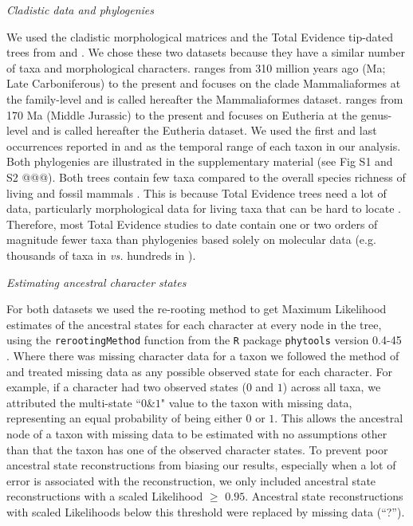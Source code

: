 \documentclass[12pt,letterpaper]{article}
\renewcommand{\subsection}[1]{%
\bigskip
\begin{center}
\begin{large}
\normalfont\itshape #1
\end{large}
\end{center}}
\begin{document}
\subsection{Cladistic data and phylogenies}
We used the cladistic morphological matrices and the Total Evidence tip-dated trees \citep{ronquista2012} from \citet[][103 taxa with 446 morphological characters;]{Slater2012MEE} and \citet[][102 taxa with 421 morphological characters]{beckancient2014}.
We chose these two datasets because they have a similar number of taxa and morphological characters.
\cite{Slater2012MEE} ranges from 310 million years ago (Ma; Late Carboniferous) to the present and focuses on the clade Mammaliaformes at the family-level and is called hereafter the Mammaliaformes dataset.
\cite{beckancient2014} ranges from 170 Ma (Middle Jurassic) to the present and focuses on Eutheria at the genus-level and is called hereafter the Eutheria dataset.
We used the first and last occurrences reported in \cite{Slater2012MEE} and \cite{beckancient2014} as the temporal range of each taxon in our analysis.
Both phylogenies are illustrated in the supplementary material (see Fig S1 and S2 @@@).
Both trees contain few taxa compared to the overall species richness of living and fossil mammals \citep{bininda2007delayed,archibald2011extinction}.
This is because Total Evidence trees need a lot of data, particularly morphological data for living taxa that can be hard to locate \citep{GuillermeCooper}.
Therefore, most Total Evidence studies to date contain one or two orders of magnitude fewer taxa than phylogenies based solely on molecular data (e.g. thousands of taxa in \citealt{bininda2007delayed,meredithimpacts2011} \textit{vs.} hundreds in \citealt{ronquista2012,Slater2012MEE,Wood01032013,beckancient2014}).


\subsection{Estimating ancestral character states}
For both datasets we used the re-rooting method \citep{Yang01121995,Garland2000} to get Maximum Likelihood estimates of the ancestral states for each character at every node in the tree, using the \texttt{rerootingMethod} function from the \texttt{R} package \texttt{phytools} version 0.4-45 \citep{phytools,R}.
Where there was missing character data for a taxon we followed the method of \cite{Claddis} and treated missing data as any possible observed state for each character.
For example, if a character had two observed states ($0$ and $1$) across all taxa, we attributed the multi-state ``$0$\&$1$" value to the taxon with missing data, representing an equal probability of being either $0$ or $1$.
This allows the ancestral node of a taxon with missing data to be estimated with no assumptions other than that the taxon has one of the observed character states.
To prevent poor ancestral state reconstructions from biasing our results, especially when a lot of error is associated with the reconstruction, we only included ancestral state reconstructions with a scaled Likelihood $\geq$ $0.95$.
Ancestral state reconstructions with scaled Likelihoods below this threshold were replaced by missing data (``?'').
\end{document}
